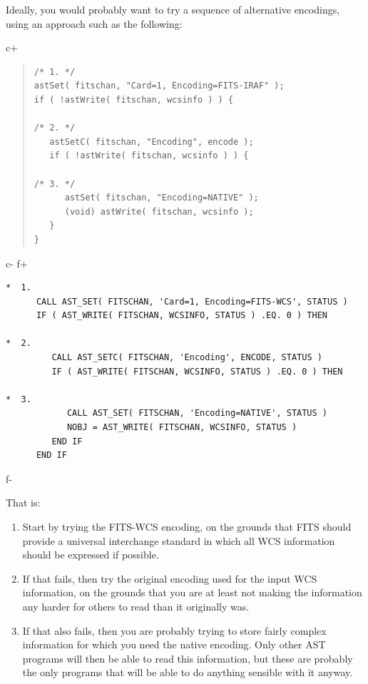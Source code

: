 \documentclass[twoside,11pt]{article}
\begin{document}
Ideally, you would probably want to try a sequence of alternative
encodings, using an approach such as the following:

c+
\begin{quote}
\small
\begin{verbatim}
/* 1. */
astSet( fitschan, "Card=1, Encoding=FITS-IRAF" );
if ( !astWrite( fitschan, wcsinfo ) ) {

/* 2. */
   astSetC( fitschan, "Encoding", encode );
   if ( !astWrite( fitschan, wcsinfo ) ) {

/* 3. */
      astSet( fitschan, "Encoding=NATIVE" );
      (void) astWrite( fitschan, wcsinfo );
   }
}
\end{verbatim}
\normalsize
\end{quote}
c-
f+
\small
\begin{verbatim}
*  1.
      CALL AST_SET( FITSCHAN, 'Card=1, Encoding=FITS-WCS', STATUS )
      IF ( AST_WRITE( FITSCHAN, WCSINFO, STATUS ) .EQ. 0 ) THEN

*  2.
         CALL AST_SETC( FITSCHAN, 'Encoding', ENCODE, STATUS )
         IF ( AST_WRITE( FITSCHAN, WCSINFO, STATUS ) .EQ. 0 ) THEN

*  3.
            CALL AST_SET( FITSCHAN, 'Encoding=NATIVE', STATUS )
            NOBJ = AST_WRITE( FITSCHAN, WCSINFO, STATUS )
         END IF
      END IF
\end{verbatim}
\normalsize
f-

That is:

\begin{enumerate}
\item Start by trying the FITS-WCS encoding, on the grounds that FITS
should provide a universal interchange standard in which all WCS
information should be expressed if possible. 

\item If that fails, then try the original encoding used for the input
WCS information, on the grounds that you are at least not making the
information any harder for others to read than it originally was.

\item If that also fails, then you are probably trying to store fairly
complex information for which you need the native encoding. Only other
AST programs will then be able to read this information, but these are
probably the only programs that will be able to do anything sensible
with it anyway.
\end{enumerate}
\end{document}
